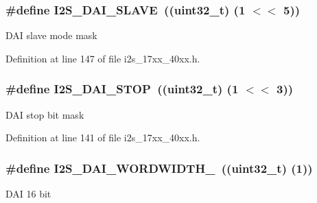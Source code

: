 \subsubsection[{\texorpdfstring{I2\+S\+\_\+\+D\+A\+I\+\_\+\+S\+L\+A\+VE}{I2S_DAI_SLAVE}}]{\setlength{\rightskip}{0pt plus 5cm}\#define I2\+S\+\_\+\+D\+A\+I\+\_\+\+S\+L\+A\+VE~((uint32\+\_\+t) (1 $<$$<$ 5))}\hypertarget{group__I2S__17XX__40XX_ga664f6b8ac38d7b3a23aae4e7a2fa1c6f}{}\label{group__I2S__17XX__40XX_ga664f6b8ac38d7b3a23aae4e7a2fa1c6f}
D\+AI slave mode mask 

Definition at line 147 of file i2s\+\_\+17xx\+\_\+40xx.\+h.

\subsubsection[{\texorpdfstring{I2\+S\+\_\+\+D\+A\+I\+\_\+\+S\+T\+OP}{I2S_DAI_STOP}}]{\setlength{\rightskip}{0pt plus 5cm}\#define I2\+S\+\_\+\+D\+A\+I\+\_\+\+S\+T\+OP~((uint32\+\_\+t) (1 $<$$<$ 3))}\hypertarget{group__I2S__17XX__40XX_ga2ed2d2a9f59339ad3cf1f28a78bfcad6}{}\label{group__I2S__17XX__40XX_ga2ed2d2a9f59339ad3cf1f28a78bfcad6}
D\+AI stop bit mask 

Definition at line 141 of file i2s\+\_\+17xx\+\_\+40xx.\+h.

\subsubsection[{\texorpdfstring{I2\+S\+\_\+\+D\+A\+I\+\_\+\+W\+O\+R\+D\+W\+I\+D\+T\+H\+\_\+16}{I2S_DAI_WORDWIDTH_16}}]{\setlength{\rightskip}{0pt plus 5cm}\#define I2\+S\+\_\+\+D\+A\+I\+\_\+\+W\+O\+R\+D\+W\+I\+D\+T\+H\+\_~((uint32\+\_\+t) (1))}\hypertarget{group__I2S__17XX__40XX_ga26e60492415a246afde8d4ede5aa292e}{}\label{group__I2S__17XX__40XX_ga26e60492415a246afde8d4ede5aa292e}
D\+AI 16 bit 

